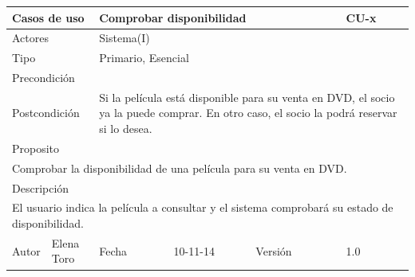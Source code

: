 \documentclass{article}
\begin{document}
\begin{table}[ht]
\begin{tabular}{|l|l|l|l|l|l|}
\hline
\multicolumn{2}{|p{2cm}|}{Casos de uso}  & \multicolumn{3}{p{7cm}|}{Comprobar disponibilidad} & CU-x \\
\hline
\multicolumn{2}{|p{2cm}|}{Actores}       & \multicolumn{4}{p{8cm}|}{Sistema(I)}        \\
\hline
\multicolumn{2}{|p{2cm}|}{Tipo}          & \multicolumn{4}{p{8cm}|}{Primario, Esencial}        \\
\hline
\multicolumn{2}{|p{2cm}|}{Precondición}  & \multicolumn{4}{p{8cm}|}{}        \\
\hline
\multicolumn{2}{|p{2cm}|}{Postcondición} & \multicolumn{4}{p{8cm}|}{Si la película está disponible para su venta en DVD, el socio ya la puede comprar. En otro caso, el socio la podrá reservar si lo desea.}        \\
\hline
\multicolumn{6}{|p{10cm}|}{Proposito}                                   \\
\hline
\multicolumn{6}{|p{10cm}|}{Comprobar la disponibilidad de una película para su venta en DVD.}                                            \\
\hline
\multicolumn{6}{|p{10cm}|}{Descripción}                                 \\
\hline
\multicolumn{6}{|p{10cm}|}{El usuario indica la película a consultar y el sistema comprobará su estado de disponibilidad.}                                            \\
\hline
Autor           &Elena Toro              & Fecha    &10-11-14     &   Versión  &1.0\\
\hline
\end{tabular}
\end{table}
\end{document}
